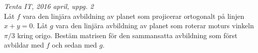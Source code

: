 {\it Tenta IT, 2016 april, uppg. 2}\\
Låt $f$ vara den linjära avbildning av planet som projicerar ortogonalt på linjen $x+y=0$. Låt $g$ vara den linjära avbildning av planet som roterar moturs vinkeln $\pi/3$ kring origo. Bestäm matrisen för den sammansatta avbildning som först avbildar med $f$ och sedan med $g$.